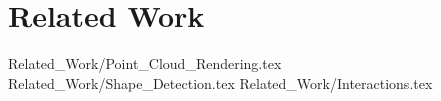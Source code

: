 \chapter {Related Work}
 {Related_Work/Point_Cloud_Rendering.tex}
 {Related_Work/Shape_Detection.tex}
 {Related_Work/Interactions.tex}